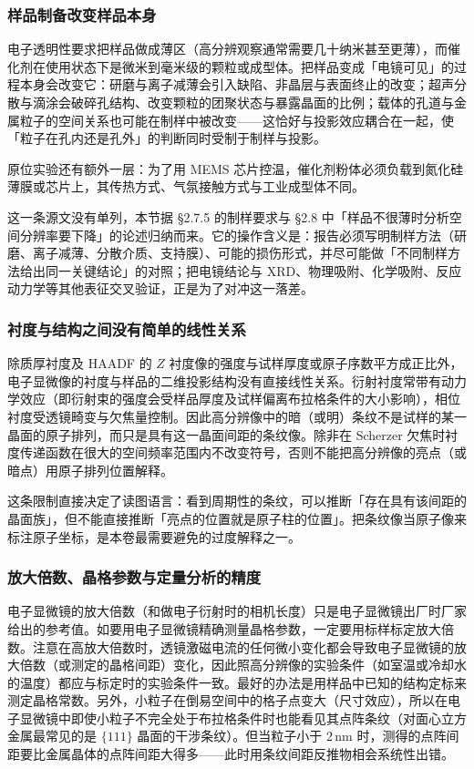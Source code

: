 \subsubsection{样品制备改变样品本身}

电子透明性要求把样品做成薄区（高分辨观察通常需要几十纳米甚至更薄），而催化剂在使用状态下是微米到毫米级的颗粒或成型体。把样品变成「电镜可见」的过程本身会改变它：研磨与离子减薄会引入缺陷、非晶层与表面终止的改变；超声分散与滴涂会破碎孔结构、改变颗粒的团聚状态与暴露晶面的比例；载体的孔道与金属粒子的空间关系也可能在制样中被改变——这恰好与投影效应耦合在一起，使「粒子在孔内还是孔外」的判断同时受制于制样与投影。

原位实验还有额外一层：为了用 MEMS 芯片控温，催化剂粉体必须负载到氮化硅薄膜或芯片上，其传热方式、气氛接触方式与工业成型体不同。

这一条源文没有单列，本节据 \S 2.7.5 的制样要求与 \S 2.8 中「样品不很薄时分析空间分辨率要下降」的论述归纳而来。它的操作含义是：报告必须写明制样方法（研磨、离子减薄、分散介质、支持膜）、可能的损伤形式，并尽可能做「不同制样方法给出同一关键结论」的对照；把电镜结论与 XRD、物理吸附、化学吸附、反应动力学等其他表征交叉验证，正是为了对冲这一落差。

\subsubsection{衬度与结构之间没有简单的线性关系}

除质厚衬度及 HAADF 的 $Z$ 衬度像的强度与试样厚度或原子序数平方成正比外，电子显微像的衬度与样品的二维投影结构没有直接线性关系。衍射衬度常带有动力学效应（即衍射束的强度会受样品厚度及试样偏离布拉格条件的大小影响），相位衬度受透镜畸变与欠焦量控制。因此高分辨像中的暗（或明）条纹不是试样的某一晶面的原子排列，而只是具有这一晶面间距的条纹像。除非在 Scherzer 欠焦时衬度传递函数在很大的空间频率范围内不改变符号，否则不能把高分辨像的亮点（或暗点）用原子排列位置解释。

这条限制直接决定了读图语言：看到周期性的条纹，可以推断「存在具有该间距的晶面族」，但不能直接推断「亮点的位置就是原子柱的位置」。把条纹像当原子像来标注原子坐标，是本卷最需要避免的过度解释之一。

\subsubsection{放大倍数、晶格参数与定量分析的精度}

电子显微镜的放大倍数（和做电子衍射时的相机长度）只是电子显微镜出厂时厂家给出的参考值。如要用电子显微镜精确测量晶格参数，一定要用标样标定放大倍数。注意在高放大倍数时，透镜激磁电流的任何微小变化都会导致电子显微镜的放大倍数（或测定的晶格间距）变化，因此照高分辨像的实验条件（如室温或冷却水的温度）都应与标定时的实验条件一致。最好的办法是用样品中已知的结构定标来测定晶格常数。另外，小粒子在倒易空间中的格子点变大（尺寸效应），所以在电子显微镜中即使小粒子不完全处于布拉格条件时也能看见其点阵条纹（对面心立方金属最常见的是 $\{111\}$ 晶面的干涉条纹）。但当粒子小于 2\,nm 时，测得的点阵间距要比金属晶体的点阵间距大得多——此时用条纹间距反推物相会系统性出错。

